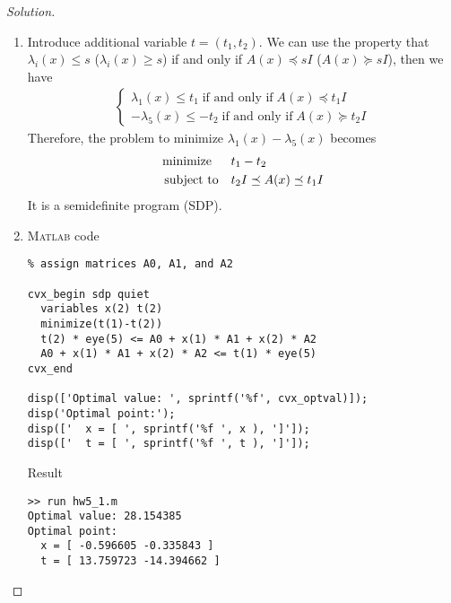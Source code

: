 \documentclass[12pt]{extarticle}
\theoremstyle{definition}
\begin{document}
\begin{proof}[Solution]
  \let\qed\relax
  $ $
  \begin{enumerate}[label=(\alph*)]
    \item Introduce additional variable $t=(t_1,t_2)$.
          We can use the property that $\lambda_i(x)\le s$ ($\lambda_i(x)\ge s$) if and only if $A(x)\preceq sI$ ($A(x)\succeq sI$), then we have
          \begin{align*}
            \begin{cases}
              \lambda_1(x)\le t_1\;\text{if and only if}\;A(x)\preceq t_1I\\
              -\lambda_5(x)\le -t_2\;\text{if and only if}\;A(x)\succeq t_2I
            \end{cases}
          \end{align*}
          Therefore, the problem to minimize $\lambda_1(x)-\lambda_5(x)$ becomes
          \begin{align*}
            \text{minimize\;\;}\quad& t_1-t_2\\
            \text{subject to}  \quad& t_2I\preceq A(x)\preceq t_1I
          \end{align*}
          It is a semidefinite program (SDP).
    \item \textsc{Matlab} code

\begin{lstlisting}[style=Matlab-editor]
% file: hw5_1.m
% assign matrices A0, A1, and A2

cvx_begin sdp quiet
  variables x(2) t(2)
  minimize(t(1)-t(2))
  t(2) * eye(5) <= A0 + x(1) * A1 + x(2) * A2
  A0 + x(1) * A1 + x(2) * A2 <= t(1) * eye(5)
cvx_end

disp(['Optimal value: ', sprintf('%f', cvx_optval)]);
disp('Optimal point:');
disp(['  x = [ ', sprintf('%f ', x ), ']']);
disp(['  t = [ ', sprintf('%f ', t ), ']']);
\end{lstlisting}
Result
\begin{lstlisting}[style=Matlab-editor]
>> run hw5_1.m
Optimal value: 28.154385
Optimal point:
  x = [ -0.596605 -0.335843 ]
  t = [ 13.759723 -14.394662 ]
\end{lstlisting}

  \end{enumerate}
\end{proof}
\end{document}
